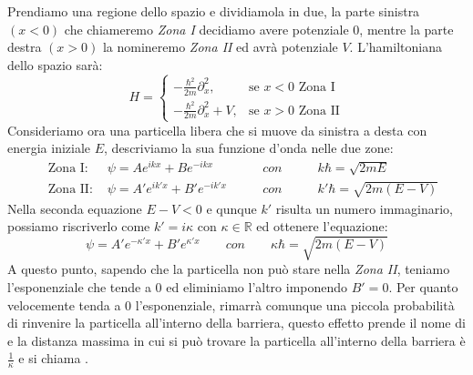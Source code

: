Prendiamo una regione dello spazio e dividiamola in due, la parte sinistra $(x < 0)$ che chiameremo \textit{Zona I} decidiamo avere potenziale $0$, mentre la parte destra $(x > 0)$ la nomineremo \textit{Zona II} ed avrà potenziale $V$. L'hamiltoniana dello spazio sarà:
$$H=\begin{cases} - \frac{\hbar^2}{2m} \partial_x^2, & \mbox{se } x<0 \mbox{ Zona I} \\ - \frac{\hbar^2}{2m} \partial_x^2 + V, & \mbox{se } x>0 \mbox{ Zona II}
\end{cases}$$
Consideriamo ora una particella libera che si muove da sinistra a desta con energia iniziale $E$, descriviamo la sua funzione d'onda nelle due zone:
\begin{equation}
\begin{aligned}
  \quad \mbox{Zona I: }  &\psi = Ae^{ikx} + Be^{-ikx} \qquad & con \qquad & k\hbar = \sqrt{2mE}\\
  \quad \mbox{Zona II: } &\psi = A'e^{ik'x} + B'e^{-ik'x} \qquad & con \qquad & k'\hbar = \sqrt{2m(E-V)}
\end{aligned}
\end{equation}
Nella seconda equazione $E - V < 0$ e qunque $k'$ risulta un numero immaginario, possiamo riscriverlo come $k' = i \kappa$ con $\kappa \in \mathbb{R}$ ed ottenere l'equazione:
$$\psi = A'e^{-\kappa'x} + B'e^{\kappa'x} \qquad  con \qquad \kappa\hbar = \sqrt{2m(E-V)}$$
A questo punto, sapendo che la particella non può stare nella \textit{Zona II}, teniamo l'esponenziale che tende a $0$ ed eliminiamo l'altro imponendo $B' = 0$. Per quanto velocemente tenda a $0$ l'esponenziale, rimarrà comunque una piccola probabilità di rinvenire la particella all'interno della barriera, questo effetto prende il nome di  e la distanza massima in cui si può trovare la particella all'interno della barriera è $\frac{1}{\kappa}$ e si chiama .

